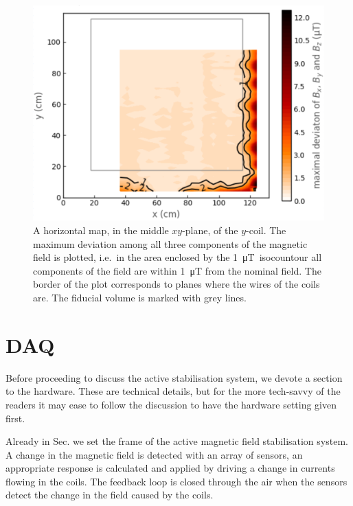 \begin{figure}
  \centering
  \includegraphics[width=0.9\linewidth]{gfx/prototype/plane_map.png}
  \caption{A horizontal map, in the middle $xy$-plane, of the $y$-coil. The maximum deviation among all three components of the magnetic field is plotted, i.e.\ in the area enclosed by the \SI{1}{\micro\tesla}~isocountour all components of the field are within \SI{1}{\micro\tesla} from the nominal field. The border of the plot corresponds to planes where the wires of the coils are. The fiducial volume is marked with grey lines.}
  \label{fig:prototype_plane_map}
\end{figure}



\section{DAQ}
Before proceeding to discuss the active stabilisation system, we devote a section to the hardware. These are technical details, but for the more tech-savvy of the readers it may ease to follow the discussion to have the hardware setting given first.

Already in Sec.  we set the frame of the active magnetic field stabilisation system. A change in the magnetic field is detected with an array of sensors, an appropriate response is calculated and applied by driving a change in currents flowing in the coils. The feedback loop is closed through the air when the sensors detect the change in the field caused by the coils.


